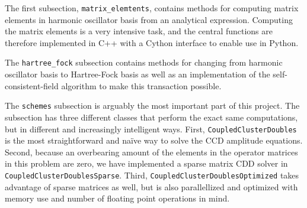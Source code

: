 \documentclass[
    a4paper, aps, twocolumn, floatfix, superscriptaddress,
    nofootinbib]{revtex4-1}
\newcommand{\1}{\mathds{1}}
\begin{document}
        \vspace{10pt}
        \vspace{10pt}

        The first subsection, \texttt{matrix_elemtents},
        contains methods for computing matrix elements in harmonic
        oscillator basis from an analytical
        expression\cite{anisimovas1998energy}.  Computing the matrix
        elements is a very intensive task, and the central functions are
        therefore implemented in C++ with a Cython interface to enable use
        in Python.

        The \texttt{hartree_fock} subsection contains methods
        for changing from harmonic oscillator basis to Hartree-Fock basis as
        well as an implementation of the self-consistent-field algorithm to
        make this transaction possible.

        The \texttt{schemes} subsection is arguably the most
        important part of this project. The subsection has three different
        classes that perform the exact same computations, but in different
        and increasingly intelligent ways. First,
        \texttt{CoupledClusterDoubles} is the most
        straightforward and naïve way to solve the CCD amplitude equations.
        Second, because an overbearing amount of the elements in the
        operator matrices in this problem are zero, we have implemented a
        sparse matrix CDD solver in
        \texttt{CoupledClusterDoublesSparse}. Third,
        \texttt{CoupledClusterDoublesOptimized} takes advantage
        of sparse matrices as well, but is also parallellized and optimized
        with memory use and number of floating point operations in mind.
\end{document}
